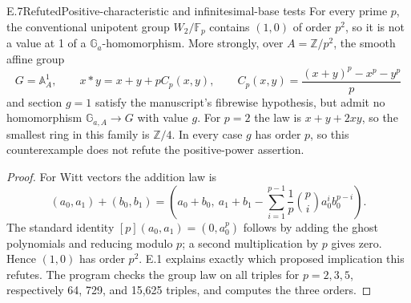 \begin{statement}{E.7}{Refuted}{Positive-characteristic and infinitesimal-base tests}
For every prime \(p\), the conventional unipotent group \(W_2/\mathbb F_p\)
contains \((1,0)\) of order \(p^2\), so it is not a value at 1 of a
\(\mathbb G_a\)-homomorphism.  More strongly, over
\(A=\mathbb Z/p^2\), the smooth affine group
\[
 G=\mathbb A^1_A,\qquad
 x*y=x+y+pC_p(x,y),\qquad
 C_p(x,y)=\frac{(x+y)^p-x^p-y^p}{p}
\]
and section \(g=1\) satisfy the manuscript's fibrewise hypothesis,
but admit no homomorphism \(\mathbb G_{a,A}\to G\) with value \(g\).
For \(p=2\) the law is \(x+y+2xy\), so the smallest ring in this
family is \(\mathbb Z/4\).  In every case \(g\) has order \(p\),
so this counterexample does not refute the positive-power assertion.
\end{statement}
\begin{proof}
For Witt vectors the addition law is
\[
 (a_0,a_1)+(b_0,b_1)=
 \left(a_0+b_0,\ a_1+b_1-
 \sum_{i=1}^{p-1}\frac1p\binom pi a_0^i b_0^{p-i}\right).
\]
The standard identity \([p](a_0,a_1)=(0,a_0^p)\) follows by adding
the ghost polynomials and reducing modulo \(p\); a second multiplication
by \(p\) gives zero.  Hence \((1,0)\) has order \(p^2\).  E.1 explains
exactly which proposed implication this refutes.  The program checks
the group law on all triples for \(p=2,3,5\), respectively 64, 729,
and 15,625 triples, and computes the three orders.


\end{proof}
